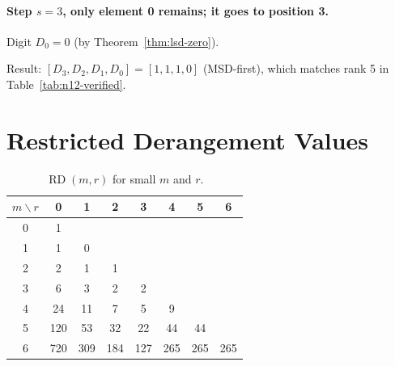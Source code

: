 \documentclass[11pt,a4paper]{article}
\newcommand{\rder}[2]{\operatorname{RD}(#1,#2)} %
\begin{document}
    \paragraph{Step $s=3$, only element 0 remains; it goes to position 3.}
    Digit $D_0 = 0$ (by Theorem~\ref{thm:lsd-zero}).

    \noindent
    Result: $[D_3, D_2, D_1, D_0] = [1,1,1,0]$ (MSD-first), which matches rank 5 in
    Table~\ref{tab:n12-verified}.

    \section{Restricted Derangement Values}
    \label{app:rder}

    \begin{table}[h]
        \centering
        \caption{$\rder{m}{r}$ for small $m$ and $r$.}
        \begin{tabular}{c|ccccccc}
            \toprule
            $m \backslash r$ & 0 & 1 & 2 & 3 & 4 & 5 & 6 \\
            \midrule
            0 & 1 & & & & & & \\
            1 & 1 & 0 & & & & & \\
            2 & 2 & 1 & 1 & & & & \\
            3 & 6 & 3 & 2 & 2 & & & \\
            4 & 24 & 11 & 7 & 5 & 9 & & \\
            5 & 120 & 53 & 32 & 22 & 44 & 44 & \\
            6 & 720 & 309 & 184 & 127 & 265 & 265 & 265 \\
            \bottomrule
        \end{tabular}
    \end{table}
\end{document}

